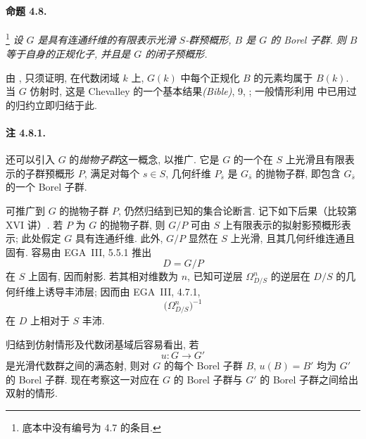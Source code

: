 \paragraph{\textbf{命题 4.8.}}
\footnote{底本中没有编号为 4.7 的条目.}
{\itshape 设 \(G\) 是具有连通纤维的有限表示光滑 \(S\)-群预概形, \(B\) 是 \(G\) 的 Borel 子群. 则 \(B\) 等于自身的正规化子, 并且是 \(G\) 的闭子预概形.}

由 , 只须证明, 在代数闭域 \(k\) 上, \(G(k)\) 中每个正规化 \(B\) 的元素均属于 \(B(k)\). 当 \(G\) 仿射时, 这是 Chevalley 的一个基本结果\textup{\emph{(Bible)}, 9, }; 一般情形利用  中已用过的归约立即归结于此.

\paragraph{\textbf{注 4.8.1.}}
还可以引入 \(G\) 的\emph{抛物子群}这一概念, 以推广. 它是 \(G\) 的一个在 \(S\) 上光滑且有限表示的子群预概形 \(P\), 满足对每个 \(s\in S\), 几何纤维 \(P_{\bar s}\) 是 \(G_{\bar s}\) 的抛物子群, 即包含 \(G_{\bar s}\) 的一个 Borel 子群.

 可推广到 \(G\) 的抛物子群 \(P\), 仍然归结到已知的集合论断言. 记下如下后果\textup{（比较第 XVI 讲）}. 若 \(P\) 为 \(G\) 的抛物子群, 则 \(G/P\) 可由 \(S\) 上有限表示的拟射影预概形表示; 此处假定 \(G\) 具有连通纤维. 此外, \(G/P\) 显然在 \(S\) 上光滑, 且其几何纤维连通且固有. 容易由 EGA~III, 5.5.1 推出
\[
  D=G/P
\]
在 \(S\) 上固有, 因而射影. 若其相对维数为 \(n\), 已知可逆层 \(\Omega^n_{D/S}\) 的逆层在 \(D/S\) 的几何纤维上诱导丰沛层; 因而由 EGA~III, 4.7.1,
\[
  \bigl(\Omega^n_{D/S}\bigr)^{-1}
\]
在 \(D\) 上相对于 \(S\) 丰沛.



归结到仿射情形及代数闭基域后容易看出, 若
\[
  u\colon G\longrightarrow G'
\]
是光滑代数群之间的满态射, 则对 \(G\) 的每个 Borel 子群 \(B\), \(u(B)=B'\) 均为 \(G'\) 的 Borel 子群. 现在考察这一对应在 \(G\) 的 Borel 子群与 \(G'\) 的 Borel 子群之间给出双射的情形.

